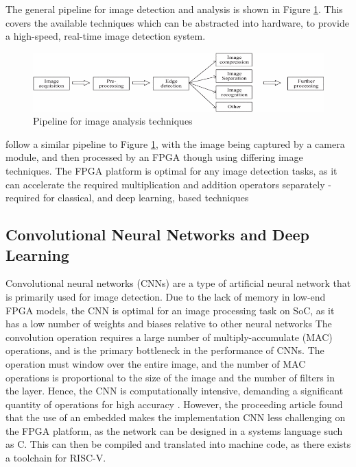 The general pipeline for image detection and analysis is shown in Figure \ref{fig:pipeline}. This covers the available techniques which can be abstracted into hardware, to provide a high-speed, real-time image detection system.

\begin{figure}[h]
    \centering
    \includegraphics[width=1\textwidth]{Assets/Pipeline.png}
    \caption{Pipeline for image analysis techniques \cite{RTEdge}}
    \label{fig:pipeline}
\end{figure}

\cite{SoCImage, Aerial} follow a similar pipeline to Figure \ref{fig:pipeline}, with the image being captured by a camera module, and then processed by an FPGA though using differing image techniques.
The FPGA platform is optimal for any image detection tasks, as it can accelerate the required multiplication and addition operators separately - required for classical, and deep learning, based techniques \cite{ResourceEfficient}



\subsection{Convolutional Neural Networks and Deep Learning}
Convolutional neural networks (CNNs) are a type of artificial neural network that is primarily used for image detection.
Due to the lack of memory in low-end FPGA models, the CNN is optimal for an image processing task on SoC, as it has a low number of weights and biases relative to other neural networks \cite{Drowsiness}
The convolution operation requires a large number of multiply-accumulate (MAC) operations, and is the primary bottleneck in the performance of CNNs.
The operation must window over the entire image, and the number of MAC operations is proportional to the size of the image and the number of filters in the layer.
Hence, the CNN is computationally intensive, demanding a significant quantity of operations for high accuracy \cite{Linear}.
However, the proceeding \cite{Drowsiness} article found that the use of an embedded makes the implementation CNN less challenging on the FPGA platform, as the network can be designed in a systems language such as C.
This can then be compiled and translated into machine code, as there exists a toolchain for RISC-V.

